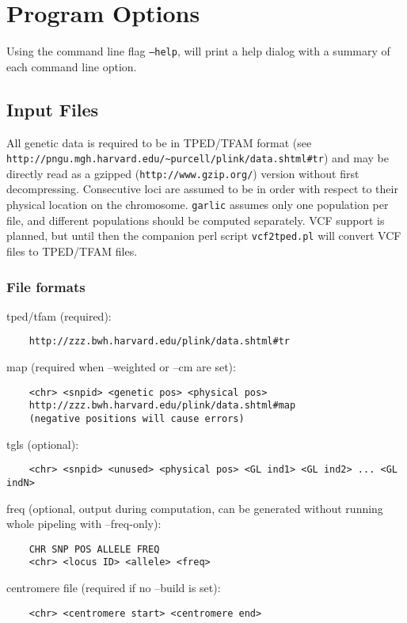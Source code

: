 \documentclass[12pt]{article}%
\begin{document}
\section{Program Options}

Using the command line flag {\tt --help}, will print a help dialog with a summary of each command line option.

\subsection{Input Files}

All genetic data is required to be in TPED/TFAM format (see \\{\tt http://pngu.mgh.harvard.edu/\textasciitilde purcell/plink/data.shtml\#tr}) and may be directly read as a gzipped ({\tt http://www.gzip.org/}) version without first decompressing.  Consecutive loci are assumed to be in order with respect to their physical location on the chromosome.  {\tt garlic} assumes only one population per file, and different populations should be computed separately.  VCF support is planned, but until then the companion perl script {\tt vcf2tped.pl} will convert VCF files to TPED/TFAM files.
\subsubsection{File formats}
\noindent tped/tfam (required):\\
\begin{verbatim}
	http://zzz.bwh.harvard.edu/plink/data.shtml#tr
\end{verbatim}
\noindent map (required when --weighted or --cm are set):
\begin{verbatim}
	<chr> <snpid> <genetic pos> <physical pos>
	http://zzz.bwh.harvard.edu/plink/data.shtml#map 
	(negative positions will cause errors)
\end{verbatim}
\noindent tgls (optional):
\begin{verbatim}
	<chr> <snpid> <unused> <physical pos> <GL ind1> <GL ind2> ... <GL indN>
\end{verbatim}
\noindent freq (optional, output during computation, can be generated without running whole pipeling with --freq-only): 
\begin{verbatim}
	CHR SNP POS ALLELE FREQ
	<chr> <locus ID> <allele> <freq>
\end{verbatim}	
\noindent centromere file (required if no --build is set):
\begin{verbatim}
	<chr> <centromere start> <centromere end>
\end{verbatim}
\end{document}
